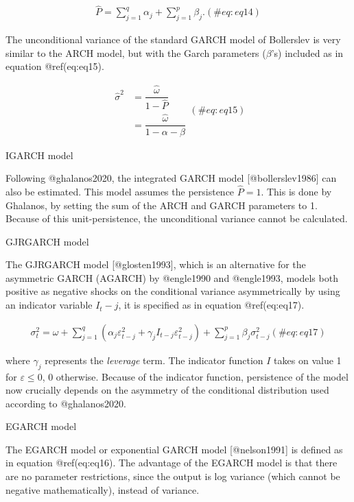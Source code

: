 \documentclass[
]{article}
\begin{document}
\begin{align}
\hat{P} = \sum\limits_{j = 1}^q {{\alpha_j}}  + \sum\limits_{j = 1}^p {{\beta_j}}.
 (\#eq:eq14)
\end{align}

\noindent The unconditional variance of the standard GARCH model of
Bollerslev is very similar to the ARCH model, but with the Garch
parameters (\(\beta\)'s) included as in equation @ref(eq:eq15).

\begin{equation}
\begin{split}
\hat{\sigma}^2 
&= \dfrac{\hat{\omega}}{1 - \hat{P}} \\
&= \dfrac{\hat{\omega}}{1 - \alpha - \beta}
\end{split}
 (\#eq:eq15)
\end{equation}

IGARCH model

\noindent Following @ghalanos2020, the integrated GARCH model
{[}@bollerslev1986{]} can also be estimated. This model assumes the
persistence \(\hat{P} = 1\). This is done by Ghalanos, by setting the
sum of the ARCH and GARCH parameters to 1. Because of this
unit-persistence, the unconditional variance cannot be calculated.

GJRGARCH model

\noindent The GJRGARCH model {[}@glosten1993{]}, which is an alternative
for the asymmetric GARCH (AGARCH) by @engle1990 and @engle1993, models
both positive as negative shocks on the conditional variance
asymmetrically by using an indicator variable \(I_t-j\), it is specified
as in equation @ref(eq:eq17).

\begin{align}
\sigma_t^2 = \omega + \sum\limits_{j=1}^q (\alpha_j \varepsilon_{t-j}^2 + \gamma_j I_{t-j} \varepsilon_{t-j}^2) + \sum\limits_{j = 1}^p \beta_j \sigma_{t-j}^2
 (\#eq:eq17)
\end{align}

\noindent where \(\gamma_j\) represents the \emph{leverage} term. The
indicator function \(I\) takes on value 1 for \(\varepsilon \le 0\), 0
otherwise. Because of the indicator function, persistence of the model
now crucially depends on the asymmetry of the conditional distribution
used according to @ghalanos2020.

EGARCH model

\noindent The EGARCH model or exponential GARCH model {[}@nelson1991{]}
is defined as in equation @ref(eq:eq16). The advantage of the EGARCH
model is that there are no parameter restrictions, since the output is
log variance (which cannot be negative mathematically), instead of
variance.
\end{document}
